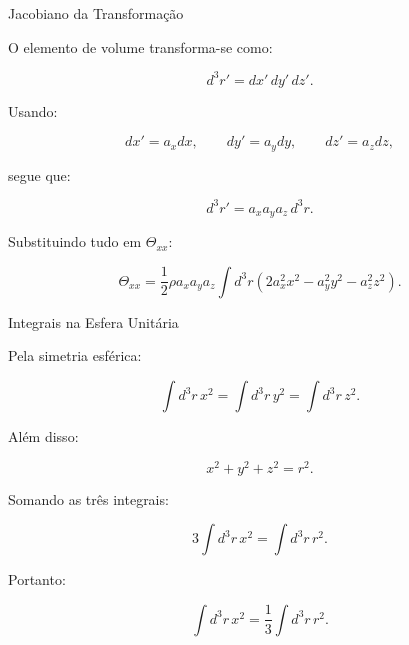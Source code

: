 \documentclass[aspectratio=169]{beamer}
\begin{document}
\begin{frame}{Jacobiano da Transformação}

\small

O elemento de volume transforma-se como:

\[
d^3r'
=
dx'\,dy'\,dz'.
\]

Usando:

\[
dx'=a_xdx,
\qquad
dy'=a_ydy,
\qquad
dz'=a_zdz,
\]

segue que:

\begin{eqbox}
\begin{equation}
d^3r'
=
a_xa_ya_z\,d^3r.
\tag{4.74}
\end{equation}
\end{eqbox}

Substituindo tudo em \(\Theta_{xx}\):

\[
\Theta_{xx}
=
\frac12
\rho a_xa_ya_z
\int d^3r
\left(
2a_x^2x^2
-
a_y^2y^2
-
a_z^2z^2
\right).
\]

\end{frame}

\begin{frame}{Integrais na Esfera Unitária}

\small

Pela simetria esférica:

\[
\int d^3r\,x^2
=
\int d^3r\,y^2
=
\int d^3r\,z^2.
\]

Além disso:

\[
x^2+y^2+z^2=r^2.
\]

Somando as três integrais:

\[
3
\int d^3r\,x^2
=
\int d^3r\,r^2.
\]

Portanto:

\begin{eqbox}
\begin{equation}
\int d^3r\,x^2
=
\frac13
\int d^3r\,r^2.
\tag{4.75}
\end{equation}
\end{eqbox}

\end{frame}
\end{document}
